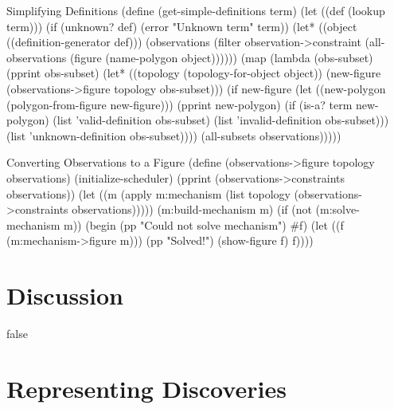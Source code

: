 \begin{code-listing}{Simplifying Definitions}
(define (get-simple-definitions term)
  (let ((def (lookup term)))
    (if (unknown? def)
        (error "Unknown term" term))
    (let* ((object ((definition-generator def)))
           (observations
            (filter
             observation->constraint
             (all-observations
              (figure (name-polygon object))))))
      (map
       (lambda (obs-subset)
         (pprint obs-subset)
         (let* ((topology (topology-for-object object))
                (new-figure
                 (observations->figure topology obs-subset)))
           (if new-figure
               (let ((new-polygon
                      (polygon-from-figure new-figure)))
                 (pprint new-polygon)
                 (if (is-a? term new-polygon)
                     (list 'valid-definition
                           obs-subset)
                     (list 'invalid-definition
                           obs-subset)))
               (list 'unknown-definition
                     obs-subset))))
       (all-subsets observations)))))
\end{code-listing}

\begin{code-listing}{Converting Observations to a Figure}
(define (observations->figure topology observations)
  (initialize-scheduler)
  (pprint (observations->constraints observations))
  (let ((m (apply
            m:mechanism
            (list
             topology
             (observations->constraints observations)))))
    (m:build-mechanism m)
    (if (not (m:solve-mechanism m))
        (begin
          (pp "Could not solve mechanism")
          #f)
        (let ((f (m:mechanism->figure m)))
          (pp "Solved!")
          (show-figure f)
          f))))
\end{code-listing}

\section{Discussion}


\if false


\section{Representing Discoveries}


\fi
